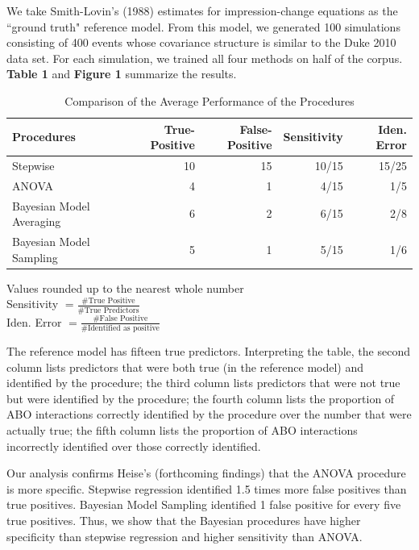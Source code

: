 \documentclass[]{article}
\begin{document}
We take Smith-Lovin's (1988) estimates for impression-change equations as the ``ground truth" reference model.  From this model, we generated 100 simulations consisting of 400 events whose covariance structure is similar to the Duke 2010 data set.  For each simulation, we trained all four methods on half of the corpus.  \textbf{Table 1} and \textbf{Figure 1} summarize the results.

\begin{table}[h]
\caption{Comparison of the Average Performance of the Procedures}
\begin{tabular}{l r r r r}
Procedures & True-Positive & False-Positive & Sensitivity & Iden. Error \\ \hline
Stepwise & 10 & 15 & 10/15 & 15/25 \\
ANOVA & 4 & 1 & 4/15 &  1/5 \\
Bayesian Model Averaging & 6 & 2 & 6/15 & 2/8 \\
Bayesian Model Sampling & 5 & 1 & 5/15 & 1/6 \\ \hline
\end{tabular}
Values rounded up to the nearest whole number\\
Sensitivity $= \frac{\text{\# True Positive}}{\text{\#  True Predictors}} $\\
Iden. Error $= \frac{\text{\# False Positive}}{\text{\#  Identified as positive}} $ 
\end{table}

The reference model has fifteen true predictors. Interpreting the table, the second column lists predictors that were both true (in the reference model) and identified by the procedure; the third column lists predictors that were not true but were identified by the procedure; the fourth column lists the proportion of ABO interactions correctly identified by the procedure over the number that were actually true; the fifth column lists the proportion of ABO interactions incorrectly identified over those correctly identified. 


Our analysis confirms Heise's (forthcoming findings) that the ANOVA procedure is more specific.  Stepwise regression identified 1.5 times more false positives than true positives. Bayesian Model Sampling identified 1 false positive for every five true positives. Thus, we show that the Bayesian procedures have higher specificity than stepwise regression and higher sensitivity than ANOVA.
\end{document}
